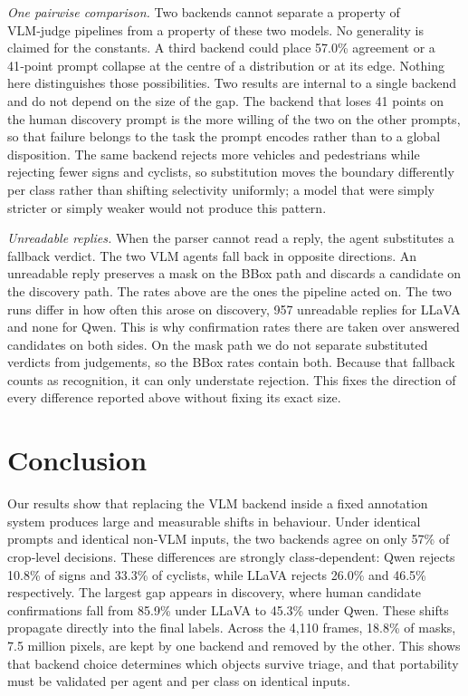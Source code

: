 \documentclass[a4paper,twoside]{article}
\begin{document}
\emph{One pairwise comparison.}
Two backends cannot separate a property of VLM‑judge pipelines from a property of these two models.
No generality is claimed for the constants.
A third backend could place 57.0\% agreement or a 41‑point prompt collapse at the centre of a distribution or at its edge.
Nothing here distinguishes those possibilities.
Two results are internal to a single backend and do not depend on the size of the gap.  
The backend that loses 41 points on the human discovery prompt is the more willing of the two on the other prompts, so that failure belongs to the task the prompt encodes rather than to a global disposition.  
The same backend rejects more vehicles and pedestrians while rejecting fewer signs and cyclists, so substitution moves the boundary differently per class rather than shifting selectivity uniformly; a model that were simply stricter or simply weaker would not produce this pattern.


\emph{Unreadable replies.}  
When the parser cannot read a reply, the agent substitutes a fallback verdict.  
The two VLM agents fall back in opposite directions.  
An unreadable reply preserves a mask on the BBox path and discards a candidate on the discovery path.  
The rates above are the ones the pipeline acted on.  
The two runs differ in how often this arose on discovery, 957 unreadable replies for LLaVA and none for Qwen.  
This is why confirmation rates there are taken over answered candidates on both sides.  
On the mask path we do not separate substituted verdicts from judgements, so the BBox rates contain both.  
Because that fallback counts as recognition, it can only understate rejection.  
This fixes the direction of every difference reported above without fixing its exact size.

\section{Conclusion}

Our results show that replacing the VLM backend inside a fixed annotation system produces large and measurable shifts in behaviour.  
Under identical prompts and identical non‑VLM inputs, the two backends agree on only 57\% of crop‑level decisions.  
These differences are strongly class‑dependent: Qwen rejects 10.8\% of signs and 33.3\% of cyclists, while LLaVA rejects 26.0\% and 46.5\% respectively.  
The largest gap appears in discovery, where human candidate confirmations fall from 85.9\% under LLaVA to 45.3\% under Qwen.  
These shifts propagate directly into the final labels.  
Across the 4,110 frames, 18.8\% of masks, 7.5 million pixels, are kept by one backend and removed by the other.  
This shows that backend choice determines which objects survive triage, and that portability must be validated per agent and per class on identical inputs.
\end{document}
